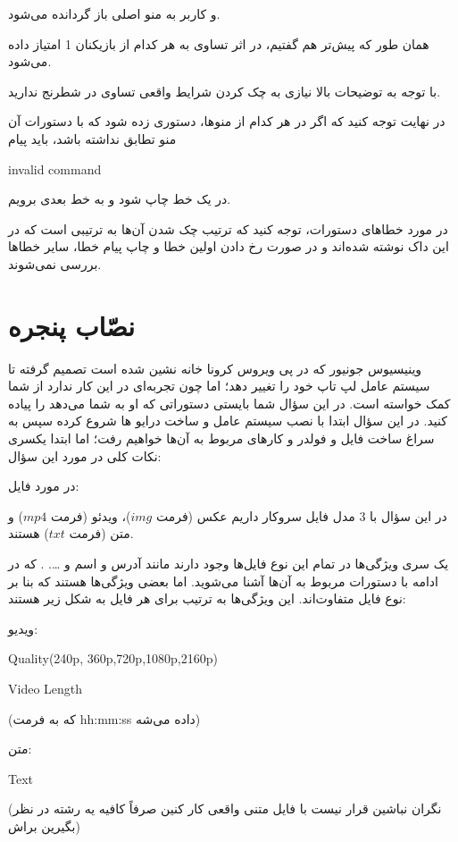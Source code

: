\documentclass[]{article}
\begin{document}
و کاربر به منو اصلی باز گردانده می‌شود.

همان طور که پیش‌تر هم گفتیم، در اثر تساوی به هر کدام از بازیکنان 1 امتیاز داده می‌شود.

با توجه به توضیحات بالا نیازی به چک کردن شرایط واقعی تساوی در شطرنج ندارید.

در نهایت توجه کنید که اگر در هر کدام از منوها، دستوری زده شود که با دستورات آن منو تطابق نداشته باشد، باید پیام 



\begin{tcolorbox}[boxrule=0pt]
	\begin{latin}
  	  \large{
  	  	invalid command
		}
	\end{latin}
\end{tcolorbox}

در یک خط چاپ شود و به خط بعدی برویم.

در مورد خطاهای دستورات، توجه کنید که ترتیب چک شدن آن‌ها به ترتیبی است که در این داک نوشته شده‌اند و در صورت رخ دادن اولین خطا و چاپ پیام خطا، سایر خطاها بررسی نمی‌شوند.


\newpage
\section{نصّاب پنجره}
وینیسیوس جونیور که در پی ویروس کرونا خانه نشین شده است تصمیم گرفته تا سیستم عامل لپ تاپ خود را تغییر دهد؛ اما چون تجربه‌ای در این کار ندارد از شما کمک خواسته است. در این سؤال شما بایستی دستوراتی که او به شما می‌دهد را پیاده کنید.
در این سؤال ابتدا با نصب سیستم عامل و ساخت درایو ها شروع کرده سپس به سراغ ساخت فایل و فولدر و کارهای مربوط به آن‌ها خواهیم رفت؛ اما ابتدا یکسری نکات کلی در مورد این سؤال:

در مورد فایل:

در این سؤال با 3 مدل فایل سروکار داریم عکس (فرمت $img$)، ویدئو (فرمت $mp4$) و متن (فرمت $txt$) هستند.

یک سری ویژگی‌ها در تمام این نوع فایل‌ها وجود دارند مانند آدرس و اسم و ….	. که در ادامه با دستورات مربوط به آن‌ها آشنا می‌شوید. اما بعضی ویژگی‌ها هستند که بنا بر نوع فایل متفاوت‌اند. این ویژگی‌ها به ترتیب برای هر فایل به شکل زیر هستند:

ویدیو:

\begin{latin}
 Quality(240p, 360p,720p,1080p,2160p)
 
Video Length
\end{latin}
(که به فرمت hh:mm:ss داده می‌شه)

متن:
\begin{latin}
Text
\end{latin}
(نگران نباشین قرار نیست با فایل متنی واقعی کار کنین صرفاً کافیه یه رشته در نظر بگیرین براش)
\end{document}
